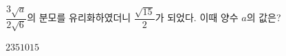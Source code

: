 $\dfrac{3\sqrt{a}}{2\sqrt{6}}$의 분모를 유리화하였더니 $\dfrac{\sqrt{15}}{2}$가 되었다. 이때 양수 $a$의 값은?
\begin{choices32}{$2$}{$3$}{$5$}{$10$}{$15$}\end{choices32}
